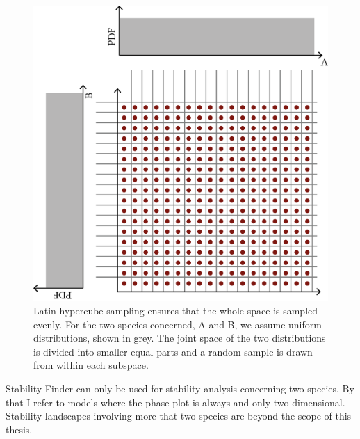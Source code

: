 \begin{figure}[htbp]
\begin{center}
\includegraphics[scale=0.5]{../../chapters/chapterStabilityFinder/images/LHS.png}
\caption[LoF caption]{\label{fig:lhs}Latin hypercube sampling ensures that the whole space is sampled evenly. For the two species concerned, A and B, we assume uniform distributions, shown in grey. The joint space of the two distributions is divided into smaller equal parts and a random sample is drawn from within each subspace.  }
\end{center}
\end{figure}

Stability Finder can only be used for stability analysis concerning two species. By that I refer to models where the phase plot is always and only two-dimensional. Stability landscapes involving more that two species are beyond the scope of this thesis. 
\clearpage

%
